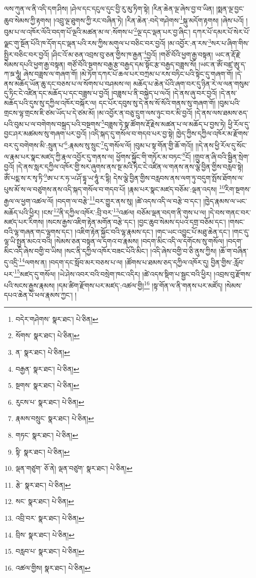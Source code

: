 ལས་ཀུན་ལ་ནི་འདི་དག་ཤིས། །ཤེལ་དང་དངུལ་དུང་བྱི་རུ་མུ་ཏིག་སྟེ། །རིན་ཆེན་ལྔ་ཞེས་བྱ་བ་ཡིན། །སྨན་ལྔ་བྱང་ཆུབ་སེམས་ཀྱི་རྟགས། །འབྲུ་ལྔ་ཐུགས་ཀྱི་རང་བཞིན་ཏེ། །རིན་ཆེན་:བདེ་གཤེགས་\footnote{བདེར་གཤེགས་  སྣར་ཐང་།  པེ་ཅིན། }སྐུ་མདོག་རྟགས། །ཞེས་པའོ། །བུམ་པ་ལ་འཁོར་ལོའི་བདག་པོ་ལྔའི་མཚན་མ་ལ་:སོགས་པ་\footnote{སོགས་  སྣར་ཐང་།  པེ་ཅིན། }ལྔ་དང་ལྡན་པར་བྱ་ཞིང་། དཀར་པོ་དམར་པོ་སེར་པོ་ལྗང་གུ་སྔོན་པོའི་ཁ་དོག་དང་ལྡན་པའི་རས་ཀྱིས་མགུལ་པ་བཅིང་བར་བྱའོ། །མ་འབྱོར་:ན་རས་\footnote{ན་  སྣར་ཐང་།  པེ་ཅིན། }སར་པ་ཞིག་གིས་སྤྱིར་བཅིང་བར་བྱའོ། །ཤིང་འོ་མ་ཅན་འབྲས་བུ་ཅན་གྱིས་ཁ་རྒྱན་\footnote{བརྒྱན་  སྣར་ཐང་།  པེ་ཅིན། }བྱའོ། །གཙོ་བོའི་ཕྱག་རྒྱ་བསྟན། ཡང་ན་རྡོ་རྗེ་སེམས་དཔའི་ཕྱག་རྒྱ་བསྟན། གཙོ་བོའི་སྔགས་བརྒྱ་རྩ་བརྒྱད་དམ་སྟོང་རྩ་བརྒྱད་བཟླས་སོ། །ཡང་ན་ཨོཾ་བཛྲ་ཨུ་ད་ཀ་ཋ་ཧཱུཾ། ཞེས་བཟླས་ལ་གཞག་གོ། །མེ་ཏོག་དཀར་པོ་ཆལ་པར་བཀྲམ་པ་རས་བཏིང་པའི་སྟེང་དུ་གཞག་གོ། །དེ་ནས་མཆོད་ཡོན་ཆུ་དང་བཅས་པ་ལ་སོགས་པ་བཤམས་ལ། མཆོད་པ་ཆེན་པོའི་ཞག་བར་དུ་ཉིན་རེ་ལ་ལན་གསུམ་དུ་ཏིང་ངེ་འཛིན་དང་མཆོད་པ་དང་བཟླས་པ་བྱའོ། །བཟླས་པ་ནི་བསྐྱེད་པ་ལའོ། །དེ་ནས་ཞུ་བར་བྱའོ། །དེ་ནས་མཆོད་པའི་དུས་སུ་དཀྱིལ་འཁོར་བསྐོར་ལ། དང་པོར་དབུས་སུ་དེ་ནས་སོ་སོའི་གནས་སུ་གཞག་གོ། །བུམ་པའི་གྲངས་ལྷ་གྲངས་ཇི་ཙམ་ཡོད་པ་དེ་ཙམ་མོ། །མ་འབྱོར་ན་བཅུ་དྲུག་ལས་ཉུང་བར་མི་བྱའོ། །དེ་ནས་ལས་ཐམས་ཅད་པའི་བུམ་པ་ལ་བགེགས་བསྐྲད་པའི་བསྔགས་\footnote{སྔགས་  སྣར་ཐང་།  པེ་ཅིན། }བཟླས་ཏེ་སྣ་ཚོགས་རྡོ་རྗེས་མཚན་པ་ལ་མཆོད་པ་བྱས་ཏེ། ཕྱི་རོལ་དུ་བྱང་ཤར་མཚམས་སུ་གཞག་པར་བྱའོ། །འདི་སྐད་དུ་གསོལ་བ་གདབ་པར་བྱ་སྟེ། ཁྱེད་ཀྱིས་དཀྱིལ་འཁོར་མ་རྫོགས་བར་དུ་བགེགས་མི་:སྲུན་པ་\footnote{རུངས་པ་  སྣར་ཐང་།  པེ་ཅིན། }:རྣམས་སུ་སྲུང་\footnote{རྣམས་བསྲུང་  སྣར་ཐང་།  པེ་ཅིན། }དུ་གསོལ་ལོ། །བུམ་པ་སྟ་གོན་གྱི་ཆོ་གའོ།། །།དེ་ནས་ཕྱི་རོལ་དུ་སོང་ལ་རྣམ་པར་སྣང་མཛད་ཀྱི་རྣལ་འབྱོར་དུ་གནས་ལ། ཕྱོགས་སྐྱོང་གི་གཏོར་མ་བཏང་\footnote{གཏང་  སྣར་ཐང་།  པེ་ཅིན། }ངོ། །གྲུབ་ན་ཞི་བའི་སྦྱིན་སྲེག་བྱའོ། །དེ་ནས་སླར་དཀྱིལ་འཁོར་གྱི་སར་ཞུགས་ནས་སྔ་མའི་ཏིང་ངེ་འཛིན་ལ་གནས་ནས་ལྕེ་བྱིན་གྱིས་བརླབ་སྟེ། ཨོཾ་པདྨ་ས་ར་སྭ་ཏི་\footnote{སྟི་  སྣར་ཐང་།  པེ་ཅིན། }ཨ་པ་ར་ཧ་ཡ་ཤོ་དྷཱ་ཡ་ཧཱུཾ་ར་དྷི། དེས་ལྕེ་བྱིན་གྱིས་བརླབས་ནས་ལག་ཏུ་བདུག་སྤོས་ཐོགས་ལ་པུས་མོ་ས་ལ་བཙུགས་ནས་འདི་སྐད་གསོལ་བ་གདབ་པོ། །རྣམ་པར་སྣང་མཛད་བཅོམ་:ལྡན་འདས། \footnote{ལྡན་གཙུག་  ཅོ་ནེ། ལྡན་བཙུག་  སྣར་ཐང་།  པེ་ཅིན། }རིག་སྔགས་རྒྱལ་ལ་ཕྱག་འཚལ་ལོ། །བདག་ལ་བརྩེ་\footnote{རྩེ་  སྣར་ཐང་།  པེ་ཅིན། }བར་གྱུར་ནས་སུ། །ཚེ་འདས་འདི་ལ་བརྩེ་བ་དང་། །ཁྱེད་རྣམས་ལ་ཡང་མཆོད་པའི་ཕྱིར། །ངས་\footnote{སང་  སྣར་ཐང་།  པེ་ཅིན། }ནི་དཀྱིལ་འཁོར་:བྲི་བར་\footnote{འབྲི་བར་  སྣར་ཐང་།  པེ་ཅིན། }འཚལ། བཅོམ་ལྡན་བདག་ནི་གུས་པ་ལ། །དེ་བས་གནང་བར་མཛད་པར་རིགས། །སངས་རྒྱས་འཇིག་རྟེན་མགོན་བརྩེ་དང་། །བྱང་ཆུབ་སེམས་དཔའ་དགྲ་བཅོམ་དང་། །གསང་བའི་ལྷ་གཞན་གང་ལྷགས་དང་། །འཇིག་རྟེན་སྐྱོང་བའི་ལྷ་རྣམས་དང་། །གང་ཡང་འབྱུང་པོ་མཐུ་ཆེན་དང་། །གང་དུ་ལྷ་ཡི་སྤྱན་མངའ་བའི། །སེམས་ཅན་བསྟན་ལ་དགའ་བ་རྣམས། །བདག་མིང་འདི་ལ་དགོངས་སུ་གསོལ། །བདག་མིང་འདི་ཞེས་བགྱི་བ་ཡིས། །སང་ནི་དཀྱིལ་འཁོར་བཟང་པོའི་མིང་། །འདི་ཞེས་བགྱི་བ་ཅི་ནུས་ཀྱིས། །ཆོ་ག་བཞིན་དུ་འདྲི་\footnote{བྲིས་  སྣར་ཐང་།  པེ་ཅིན། }ལགས་ན། །བདག་དང་སློབ་མར་བཅས་པ་ལ། །ཚོགས་པ་ཐམས་ཅད་དཀྱིལ་འཁོར་དུ། བྱིན་གྱིས་:རློབ་པར་\footnote{བརླབ་པ་  སྣར་ཐང་།  པེ་ཅིན། }མཛད་དུ་གསོལ། །ཡེ་ཤེས་འབར་བའི་བསྲེག་ཁང་འདིར། །ཚེ་འདས་སྡིག་པ་སྦྱང་བའི་ཕྱིར། །འབྲས་བུ་རྫོགས་པའི་སངས་རྒྱས་རྣམས། །དམ་ཚིག་རྫོགས་པར་མཛད་:འཚལ་གྱི།\footnote{འཚལ་གྱིས།  སྣར་ཐང་།  པེ་ཅིན། } །སྟ་གོན་ལ་ནི་གནས་པར་མཛོད། །སེམས་དཔའ་ཆེན་པོ་ཕལ་རྣམས་ཀྱང་། །
